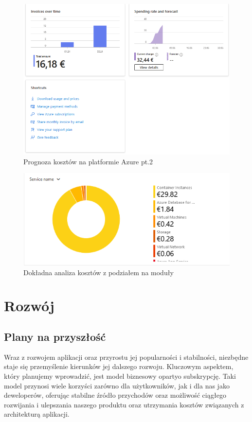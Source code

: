 \begin{figure}[h]
    \centering
    \includegraphics[width=1\textwidth]{Obrazy/costs/costs_2.png}
    \caption{Prognoza kosztów na platformie Azure pt.2}
    \label{fig:my_label}
\end{figure}

\begin{figure}[h]
    \centering
    \includegraphics[width=1\textwidth]{Obrazy/costs/costs_4.png}
    \caption{Dokładna analiza kosztów z podziałem na moduły}
    \label{fig:my_label}
\end{figure}

\clearpage

\section{Rozwój}

\subsection{Plany na przyszłość}
Wraz z rozwojem aplikacji oraz przyrostu jej popularności i stabilności, niezbędne staje się przemyślenie kierunków jej dalszego rozwoju. Kluczowym aspektem, który planujemy wprowadzić, jest model biznesowy oparty\linebreak o subskrypcję. Taki model przynosi wiele korzyści zarówno dla użytkowników, jak i dla nas jako deweloperów, oferując stabilne źródło przychodów oraz możliwość ciągłego rozwijania i ulepszania naszego produktu oraz utrzymania kosztów związanych z architekturą aplikacji.

